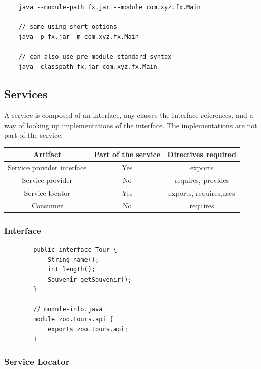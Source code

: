 \documentclass{scrartcl}
\begin{document}
\begin{lstlisting}

    java --module-path fx.jar --module com.xyz.fx.Main

    // same using short options
    java -p fx.jar -m com.xyz.fx.Main

    // can also use pre-module standard syntax
    java -classpath fx.jar com.xyz.fx.Main

\end{lstlisting}

\subsection{Services}

    A service is composed of an interface, any classes the interface references, and a way of looking up implementations of the interface.
    The implementations are not part of the service.

    \begin{tabular}{|c|c|c|}
        \hline
        Artifact& Part of the service &  Directives required\\
        \hline
        Service provider interface& Yes & exports \\
        \hline
        Service provider& No & requires, provides \\
        \hline
        Service locator	&Yes  & exports, requires,uses \\
        \hline
        Consumer& No &  requires\\
        \hline
    \end{tabular}

\subsubsection{Interface}

    \begin{lstlisting}
        public interface Tour {
            String name();
            int length();
            Souvenir getSouvenir();
        }

        // module-info.java
        module zoo.tours.api {
            exports zoo.tours.api;
        }

    \end{lstlisting}

\subsubsection{Service Locator}
\end{document}

